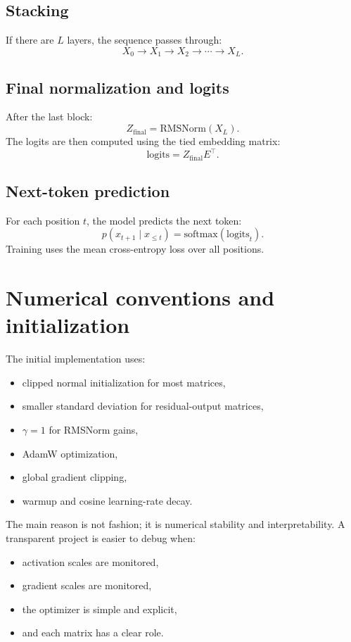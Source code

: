 \documentclass[11pt]{article}
\begin{document}
\subsection{Stacking}
If there are \(L\) layers, the sequence passes through:
\[
X_0 \rightarrow X_1 \rightarrow X_2 \rightarrow \cdots \rightarrow X_L.
\]

\subsection{Final normalization and logits}
After the last block:
\[
Z_{\text{final}} = \mathrm{RMSNorm}(X_L).
\]
The logits are then computed using the tied embedding matrix:
\[
\text{logits} = Z_{\text{final}} E^\top.
\]

\subsection{Next-token prediction}
For each position \(t\), the model predicts the next token:
\[
p(x_{t+1}\mid x_{\le t}) = \mathrm{softmax}(\text{logits}_t).
\]
Training uses the mean cross-entropy loss over all positions.

\section{Numerical conventions and initialization}

The initial implementation uses:
\begin{itemize}[leftmargin=1.5em]
    \item clipped normal initialization for most matrices,
    \item smaller standard deviation for residual-output matrices,
    \item \(\gamma = 1\) for RMSNorm gains,
    \item AdamW optimization,
    \item global gradient clipping,
    \item warmup and cosine learning-rate decay.
\end{itemize}

The main reason is not fashion; it is numerical stability and interpretability.
A transparent project is easier to debug when:
\begin{itemize}[leftmargin=1.5em]
    \item activation scales are monitored,
    \item gradient scales are monitored,
    \item the optimizer is simple and explicit,
    \item and each matrix has a clear role.
\end{itemize}
\end{document}
